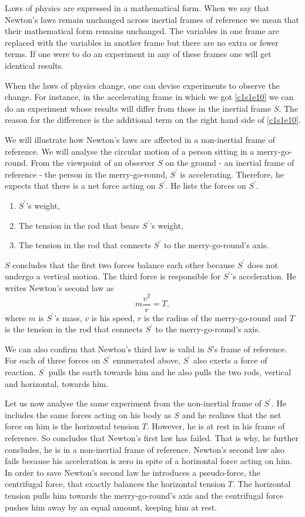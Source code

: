 Laws of physics are expressed in a mathematical form. When we say that Newton's
laws remain unchanged across inertial frames of reference we mean that their
mathematical form remains unchanged. The variables in one frame are replaced
with the variables in another frame but there are no extra or fewer terms. If
one were to do an experiment in any of these frames one will get identical
results.

When the laws of physics change, one can devise experiments to observe the 
change. For instance, in the accelerating frame in which we got \eqref{c1s1e10}
we can do an experiment whose results will differ from those in the inertial
frame $S$. The reason for the difference is the additional term on the right
hand side of \eqref{c1s1e10}.

We will illustrate how Newton's laws are affected in a non-inertial frame
of reference. We will analyse the circular motion of a person sitting in a 
merry-go-round. From the viewpoint of an observer $S$ on the ground - an 
inertial frame of reference - the person in the merry-go-round, $S^\prime$ is 
accelerating. Therefore, he expects that there is a net force acting on 
$S^\prime$. He lists the forces on $S^\prime$.
\begin{enumerate}
\item $S^\prime$'s weight,
\item The tension in the rod that bears $S^\prime$'s weight,
\item The tension in the rod that connects $S^\prime$ to the merry-go-round's
axis.
\end{enumerate}
$S$ concludes that the first two forces balance each other because $S^\prime$
does not undergo a vertical motion. The third force is responsible for 
$S^\prime$'s acceleration. He writes Newton's second law as
\begin{equation}\label{c1s1e11}
m\frac{v^2}{r} = T,
\end{equation}
where $m$ is $S^\prime$'s mass, $v$ is his speed, $r$ is the radius of the
merry-go-round and $T$ is the tension in the rod that connects $S^\prime$ to
the merry-go-round's axis.

We can also confirm that Newton's third law is valid in $S$'s frame of 
reference. For each of three forces on $S^\prime$ enumerated above, $S^\prime$
also exerts a force of reaction. $S^\prime$ pulls the earth towards him and he
also pulls the two rods, vertical and horizontal, towards him.

Let us now analyse the same experiment from the non-inertial frame of 
$S^\prime$. He includes the same forces acting on his body as $S$ and he
realizes that the net force on him is the horizontal tension $T$. However, he 
is at rest in his frame of reference. So concludes that Newton's first law has
failed. That is why, he further concludes, he is in a non-inertial frame of
reference. Newton's second law also fails because his acceleration is zero
in spite of a horizontal force acting on him. In order to save Newton's second
law he introduces a pseudo-force, the centrifugal force, that exactly balances
the horizontal tension $T$. The horizontal tension pulls him towards the
merry-go-round's axis and the centrifugal force pushes him away by an equal
amount, keeping him at rest.

